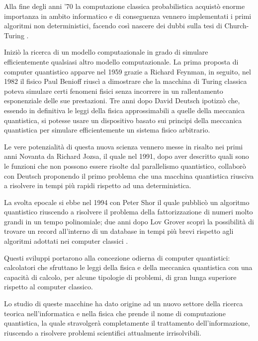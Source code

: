 Alla fine degli anni '70 la computazione classica probabilistica acquistò enorme importanza in ambito informatico e di conseguenza vennero implementati i primi algoritmi non deterministici, facendo così nascere dei dubbi sulla tesi di Church-Turing \cite{church1985articolo}.

Iniziò la ricerca di un modello computazionale in grado di simulare efficientemente qualsiasi altro modello computazionale.
La prima proposta di computer quantistico apparve nel 1959 grazie a Richard Feynman, in seguito, nel 1982 il fisico Paul Benioff \cite{quantum2001articolo} riuscì a dimostrare che la macchina di Turing classica poteva simulare certi fenomeni fisici senza incorrere in un rallentamento esponenziale delle sue prestazioni. Tre anni dopo David Deutsch \cite{hofmann2003articolo} ipotizzò che, essendo in definitiva le leggi della fisica approssimabili a quelle della meccanica quantistica, si potesse usare un dispositivo basato sui principi della meccanica quantistica per simulare efficientemente un sistema fisico arbitrario.

Le vere potenzialità di questa nuova scienza vennero messe in risalto nei primi anni Novanta da Richard Jozsa, il quale nel 1991, dopo aver descritto quali sono le funzioni che non possono essere risolte dal parallelismo quantistico, collaborò con Deutsch proponendo il primo problema che una macchina quantistica riusciva a risolvere in tempi più rapidi rispetto ad una deterministica.

La svolta epocale si ebbe nel 1994 con Peter Shor il quale pubblicò un algoritmo quantistico riuscendo a risolvere il problema della fattorizzazione di numeri molto grandi in un tempo polinomiale; due anni dopo Lov Grover scoprì la possibilità di trovare un record all'interno di un database in tempi più brevi rispetto agli algoritmi adottati nei computer classici \cite{algorithm2018articolo}.

Questi sviluppi portarono alla concezione odierna di computer quantistici: calcolatori che sfruttano le leggi della fisica e della meccanica quantistica con una capacità di calcolo, per alcune tipologie di problemi, di gran lunga superiore rispetto al computer classico.

Lo studio di queste macchine ha dato origine ad un nuovo settore della ricerca teorica nell'informatica e nella fisica che prende il nome di computazione quantistica, la quale stravolgerà completamente il trattamento dell'informazione, riuscendo a risolvere problemi scientifici attualmente irrisolvibili.

